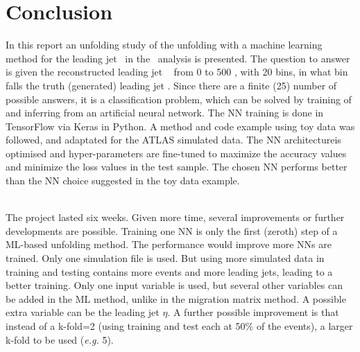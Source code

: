 \section{Conclusion}
\label{sec:Conclusion}

In this report an unfolding study of the unfolding with a machine learning method for the leading jet \pt~in the \ttbaremu~analysis is presented. The question to answer is given the reconstructed leading jet \pt~ from 0 to 500 \GeV, with 20 \GeV bins, in what bin falls the truth (generated) leading jet \pt. Since there are a finite (25) number of possible answers, it is a classification problem, which can be solved by training of and inferring from an artificial neural network. The NN training is done in TensorFlow via Keras in Python. A method and code example using toy data was followed, and adaptated for the ATLAS simulated data. The NN architectureis optimised  and hyper-parameters are fine-tuned to maximize the accuracy values and minimize the loss values in the test sample. The chosen NN performs better than the NN choice suggested in the toy data example. 

\ \\The project lasted six weeks. Given more time, several improvements or further developments are possible. Training one NN is only the first (zeroth) step of a ML-based unfolding method. The performance would improve more NNs are trained. Only one simulation file is used. But using more simulated data in training and testing contains more events and more leading jets, leading to a better training. Only one input variable is used, but several other variables can be added in the ML method, unlike in the migration matrix method. A possible extra variable can be the leading jet $\eta$. A further possible improvement is that instead of a k-fold=2 (using training and test each at 50\% of the events), a larger k-fold to be used (\emph {e.g.} 5). 
